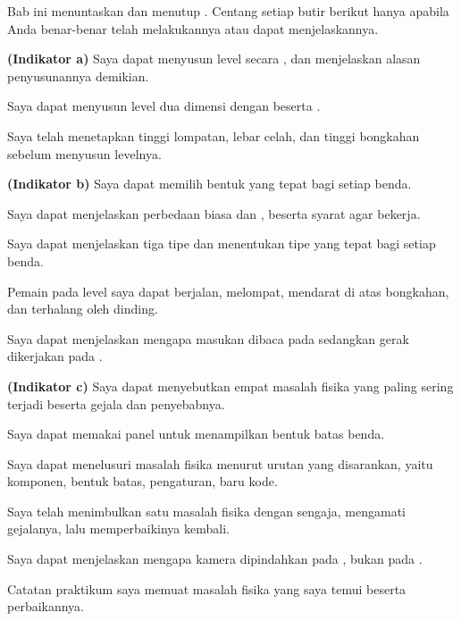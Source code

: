 
Bab ini menuntaskan  dan menutup . Centang setiap butir
berikut hanya apabila Anda benar-benar telah melakukannya atau dapat
menjelaskannya.

\begin{checklistbox}
\begin{checklist}
  \item {\bfseries (Indikator a)} Saya dapat menyusun level secara
        , dan menjelaskan alasan penyusunannya demikian.
  \item Saya dapat menyusun level dua dimensi dengan  beserta
        .
  \item Saya telah menetapkan tinggi lompatan, lebar celah, dan tinggi
        bongkahan sebelum menyusun levelnya.
  \item {\bfseries (Indikator b)} Saya dapat memilih bentuk 
        yang tepat bagi setiap benda.
  \item Saya dapat menjelaskan perbedaan  biasa dan
        , beserta syarat agar  bekerja.
  \item Saya dapat menjelaskan tiga tipe  dan menentukan
        tipe yang tepat bagi setiap benda.
  \item Pemain pada level saya dapat berjalan, melompat, mendarat di atas
        bongkahan, dan terhalang oleh dinding.
  \item Saya dapat menjelaskan mengapa masukan dibaca pada 
        sedangkan gerak dikerjakan pada .
  \item {\bfseries (Indikator c)} Saya dapat menyebutkan empat masalah fisika
        yang paling sering terjadi beserta gejala dan penyebabnya.
  \item Saya dapat memakai panel  untuk menampilkan
        bentuk batas benda.
  \item Saya dapat menelusuri masalah fisika menurut urutan yang disarankan,
        yaitu komponen, bentuk batas, pengaturan, baru kode.
  \item Saya telah menimbulkan satu masalah fisika dengan sengaja, mengamati
        gejalanya, lalu memperbaikinya kembali.
  \item Saya dapat menjelaskan mengapa kamera dipindahkan pada
        , bukan pada .
  \item Catatan praktikum saya memuat masalah fisika yang saya temui beserta
        perbaikannya.
\end{checklist}
\end{checklistbox}
